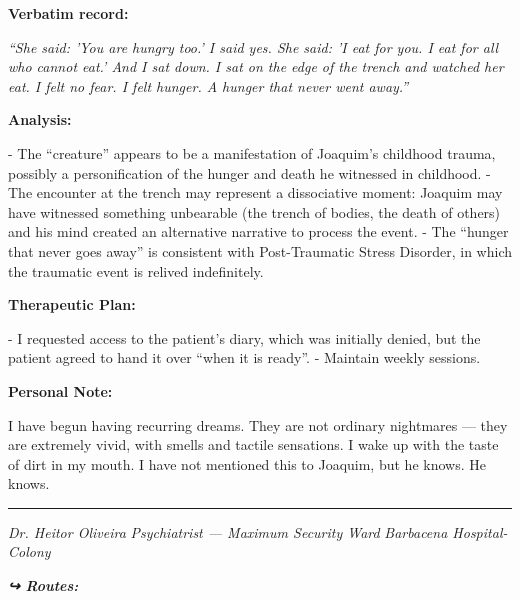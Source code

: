 \noindent \textbf{Verbatim record:}

\noindent \textit{\textquotedblleft{}She said: 'You are hungry too.' I said yes. She said: 'I eat for you. I eat for all who cannot eat.' And I sat down. I sat on the edge of the trench and watched her eat. I felt no fear. I felt hunger. A hunger that never went away.\textquotedblright{}}

\noindent \textbf{Analysis:}

\noindent - The \textquotedblleft{}creature\textquotedblright{} appears to be a manifestation of Joaquim's childhood trauma, possibly a personification of the hunger and death he witnessed in childhood.
- The encounter at the trench may represent a dissociative moment: Joaquim may have witnessed something unbearable (the trench of bodies, the death of others) and his mind created an alternative narrative to process the event.
- The \textquotedblleft{}hunger that never goes away\textquotedblright{} is consistent with Post-Traumatic Stress Disorder, in which the traumatic event is relived indefinitely.

\noindent \textbf{Therapeutic Plan:}

\noindent - I requested access to the patient's diary, which was initially denied, but the patient agreed to hand it over \textquotedblleft{}when it is ready\textquotedblright{}.
- Maintain weekly sessions.

\noindent \textbf{Personal Note:}

\noindent I have begun having recurring dreams. They are not ordinary nightmares --- they are extremely vivid, with smells and tactile sensations. I wake up with the taste of dirt in my mouth. I have not mentioned this to Joaquim, but he knows. He knows.

\vspace{0.5em}\noindent\rule{\textwidth}{0.5pt}\vspace{0.5em}

\noindent \textit{Dr. Heitor Oliveira}
\textit{Psychiatrist --- Maximum Security Ward}
\textit{Barbacena Hospital-Colony}

\vspace{0.5em}
\noindent\textit{\textbf{↪ Routes:}  \rotasep {} \rotasep {}}
